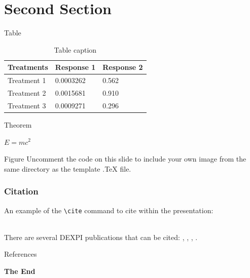 \documentclass[aspectratio=169,xcolor=dvipsnames]{beamer}
\begin{document}
\section{Second Section}

\begin{frame}{Table}
    \begin{table}
        \begin{tabular}{l l l}
            \toprule
            \textbf{Treatments} & \textbf{Response 1} & \textbf{Response 2} \\
            \midrule
            Treatment 1         & 0.0003262           & 0.562               \\
            Treatment 2         & 0.0015681           & 0.910               \\
            Treatment 3         & 0.0009271           & 0.296               \\
            \bottomrule
        \end{tabular}
        \caption{Table caption}
    \end{table}
\end{frame}


\begin{frame}{Theorem}
    \begin{theorem}
        $E = mc^2$
    \end{theorem}
\end{frame}


\begin{frame}{Figure}
    Uncomment the code on this slide to include your own image from the same directory as the template .TeX file.
\end{frame}


\begin{frame}[fragile] %
    \frametitle{Citation}
    An example of the \verb|\cite| command to cite within the presentation:\\~

    There are several DEXPI publications that can be cited: \cite{wiedau2019enpro}, \cite{oeing2022using}, \cite{cameron2024dexpi}, \cite{otten2024dexpi}.
\end{frame}


\begin{frame}{References}
    \footnotesize
    
    
\end{frame}


\begin{frame}
    \Huge{\centerline{\textbf{The End}}}
\end{frame}
\end{document}
